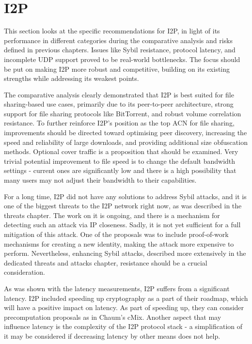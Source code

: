\section{I2P}

This section looks at the specific recommendations for I2P, in light of its performance in different categories during the comparative analysis and risks defined in previous chapters. Issues like Sybil resistance, protocol latency, and incomplete UDP support proved to be real-world bottlenecks. The focus should be put on making I2P more robust and competitive, building on its existing strengths while addressing its weakest points.

The comparative analysis clearly demonstrated that I2P is best suited for file sharing-based use cases, primarily due to its peer-to-peer architecture, strong support for file sharing protocols like BitTorrent, and robust volume correlation resistance. To further reinforce I2P’s position as the top ACN for file sharing, improvements should be directed toward optimising peer discovery, increasing the speed and reliability of large downloads, and providing additional size obfuscation methods. Optional cover traffic is a proposition that should be examined. Very trivial potential improvement to file speed is to change the default bandwidth settings - current ones are significantly low and there is a high possibility that many users may not adjust their bandwidth to their capabilities.

For a long time, I2P did not have any solutions to address Sybil attacks, and it is one of the biggest threats to the I2P network right now, as was described in the threats chapter. The work on it is ongoing, and there is a mechanism for detecting such an attack via IP closeness. Sadly, it is not yet sufficient for a full mitigation of this attack. One of the proposals was to include proof-of-work mechanisms for creating a new identity, making the attack more expensive to perform. Nevertheless, enhancing Sybil attacks, described more extensively in the dedicated threats and attacks chapter, resistance should be a crucial consideration.

As was shown with the latency measurements, I2P suffers from a significant latency. I2P included speeding up cryptography as a part of their roadmap, which will have a positive impact on latency. As part of speeding up, they can consider precomputation proposals as in Chaum’s cMix. Another aspect that may influence latency is the complexity of the I2P protocol stack - a simplification of it may be considered if decreasing latency by other means does not help.

